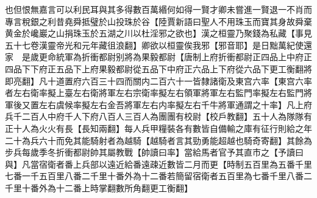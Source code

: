 也但恨無嘉言可以利民耳與其多得數百萬緡何如得一賢才卿未嘗進一賢退一不肖而專言稅銀之利昔堯舜抵璧於山投珠於谷【陸賈新語曰聖人不用珠玉而寶其身故舜棄黄金於巉巖之山捐珠玉於五湖之川以杜淫邪之欲也】漢之桓靈乃聚錢為私藏【事見五十七卷漢靈帝光和元年藏徂浪翻】卿欲以桓靈俟我邪【邪音耶】是日黜萬紀使還家　是歲更命統軍為折衝都尉别將為果毅都尉【唐制上府折衝都尉正四品上中府正四品下下府正五品下上府果毅都尉從五品下中府正六品上下府從六品下更工衡翻將即亮翻】凡十道置府六百三十四而關内二百六十一皆隸諸衛及東宫六率【東宫六率者左右衛率擬上臺左右衛將軍左右宗衛率擬左右領軍將軍左右監門率擬左右監門將軍後又置左右虞候率擬左右金吾將軍左右内率擬左右千牛將軍通謂之十率】凡上府兵千二百人中府千人下府八百人三百人為團團有校尉【校戶教翻】五十人為隊隊有正十人為火火有長【長知兩翻】每人兵甲糧裝各有數皆自備輸之庫有征行則給之年二十為兵六十而免其能騎射者為越騎【越騎者言其勁勇能超越也騎奇寄翻】其餘為步兵每歲季冬折衝都尉帥其屬教戰【帥讀曰率】當給馬者官予其直市之【予讀曰與】凡當宿衛者番上兵部以遠近給番遠疎近數皆二月而更【時制五百里為五番千里七番一千五百里八番二千里十番外為十二番若簡留宿衛者五百里為七番千里八番二千里十番外為十二番上時掌翻數所角翻更工衡翻】


